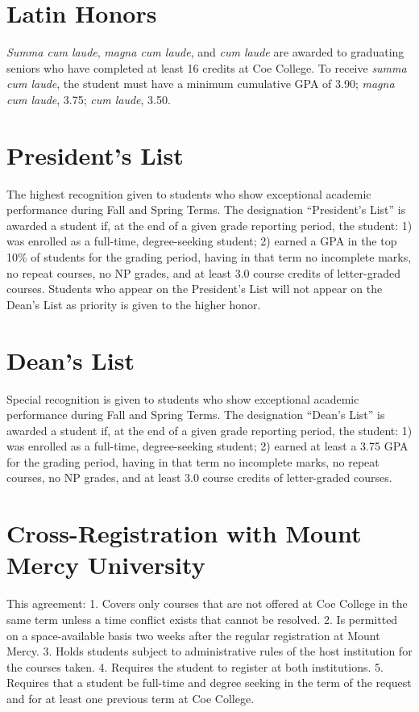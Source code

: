 \documentclass[
  letterpaper,
]{scrbook}
\begin{document}
\section{Latin Honors}\label{latin-honors}

\emph{Summa cum laude}, \emph{magna cum laude}, and \emph{cum laude} are
awarded to graduating seniors who have completed at least 16 credits at
Coe College. To receive \emph{summa cum laude}, the student must have a
minimum cumulative GPA of 3.90; \emph{magna cum laude}, 3.75; \emph{cum
laude}, 3.50.

\section{President's List}\label{presidents-list}

The highest recognition given to students who show exceptional academic
performance during Fall and Spring Terms. The designation ``President's
List'' is awarded a student if, at the end of a given grade reporting
period, the student: 1) was enrolled as a full-time, degree-seeking
student; 2) earned a GPA in the top 10\% of students for the grading
period, having in that term no incomplete marks, no repeat courses, no
NP grades, and at least 3.0 course credits of letter-graded courses.
Students who appear on the President's List will not appear on the
Dean's List as priority is given to the higher honor.

\section{Dean's List}\label{deans-list}

Special recognition is given to students who show exceptional academic
performance during Fall and Spring Terms. The designation ``Dean's
List'' is awarded a student if, at the end of a given grade reporting
period, the student: 1) was enrolled as a full-time, degree-seeking
student; 2) earned at least a 3.75 GPA for the grading period, having in
that term no incomplete marks, no repeat courses, no NP grades, and at
least 3.0 course credits of letter-graded courses.

\section{Cross-Registration with Mount Mercy
University}\label{cross-registration-with-mount-mercy-university}

This agreement: 1. Covers only courses that are not offered at Coe
College in the same term unless a time conflict exists that cannot be
resolved. 2. Is permitted on a space-available basis two weeks after the
regular registration at Mount Mercy. 3. Holds students subject to
administrative rules of the host institution for the courses taken. 4.
Requires the student to register at both institutions. 5. Requires that
a student be full-time and degree seeking in the term of the request and
for at least one previous term at Coe College.
\end{document}
